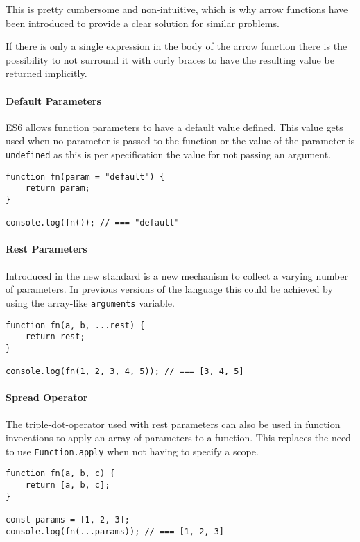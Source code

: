 \documentclass{bioinfo}
\begin{document}
This is pretty cumbersome and non-intuitive, which is why arrow functions
have been introduced to provide a clear solution for similar problems.

If there is only a single expression in the body of the arrow function there is
the possibility to not surround it with curly braces to have the resulting value
be returned implicitly.

\paragraph{Default Parameters\textcolon}
ES6 allows function parameters to have a default value defined. This value gets used when
no parameter is passed to the function or the value of the parameter is {\tt undefined} as
this is per specification the value for not passing an argument.

\begin{lstlisting}
function fn(param = "default") {
    return param;
}

console.log(fn()); // === "default"
\end{lstlisting}

\paragraph{Rest Parameters\textcolon}
Introduced in the new standard is a new mechanism to collect a varying number of parameters.
In previous versions of the language this could be achieved by using the array-like
{\tt arguments} variable.

\begin{lstlisting}
function fn(a, b, ...rest) {
    return rest;
}

console.log(fn(1, 2, 3, 4, 5)); // === [3, 4, 5]
\end{lstlisting}

\paragraph{Spread Operator}
The triple-dot-operator used with rest parameters can also be used in function invocations
to apply an array of parameters to a function. This replaces the need to use {\tt Function.apply}
when not having to specify a scope.

\begin{lstlisting}
function fn(a, b, c) {
    return [a, b, c];
}

const params = [1, 2, 3];
console.log(fn(...params)); // === [1, 2, 3]
\end{lstlisting}
\end{document}

